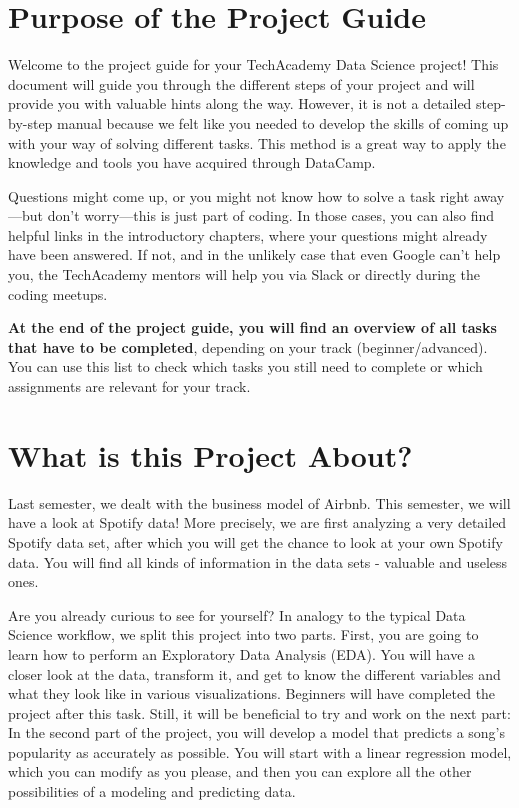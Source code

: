 \documentclass[
  11pt,
]{book}
\begin{document}
\hypertarget{purpose-of-the-project-guide}{%
\section{Purpose of the Project Guide}\label{purpose-of-the-project-guide}}

Welcome to the project guide for your TechAcademy Data Science project! This document will guide you through the different steps of your project and will provide you with valuable hints along the way. However, it is not a detailed step-by-step manual because we felt like you needed to develop the skills of coming up with your way of solving different tasks. This method is a great way to apply the knowledge and tools you have acquired through DataCamp.

Questions might come up, or you might not know how to solve a task right away---but don't worry---this is just part of coding. In those cases, you can also find helpful links in the introductory chapters, where your questions might already have been answered. If not, and in the unlikely case that even Google can't help you, the TechAcademy mentors will help you via Slack or directly during the coding meetups.

\textbf{At the end of the project guide, you will find an overview of all tasks that have to be completed}, depending on your track (beginner/advanced). You can use this list to check which tasks you still need to complete or which assignments are relevant for your track.

\hypertarget{what-is-this-project-about}{%
\section{What is this Project About?}\label{what-is-this-project-about}}

Last semester, we dealt with the business model of Airbnb. This semester, we will have a look at Spotify data! More precisely, we are first analyzing a very detailed Spotify data set, after which you will get the chance to look at your own Spotify data. You will find all kinds of information in the data sets - valuable and useless ones.

Are you already curious to see for yourself? In analogy to the typical Data Science workflow, we split this project into two parts. First, you are going to learn how to perform an Exploratory Data Analysis (EDA). You will have a closer look at the data, transform it, and get to know the different variables and what they look like in various visualizations. Beginners will have completed the project after this task. Still, it will be beneficial to try and work on the next part: In the second part of the project, you will develop a model that predicts a song's popularity as accurately as possible. You will start with a linear regression model, which you can modify as you please, and then you can explore all the other possibilities of a modeling and predicting data.
\end{document}
